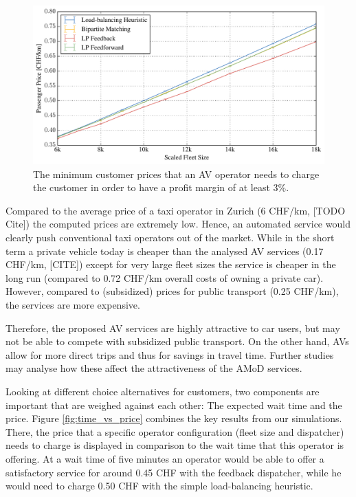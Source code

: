 \begin{figure}
\includegraphics[width=1.0\textwidth]{figures/01_passenger_price.pdf}
\caption{The minimum customer prices that an AV operator needs to charge the customer
in order to have a profit margin of at least 3\%.}
\label{fig:passenger_price}
\end{figure}

Compared to the average price of a taxi operator in Zurich (6 CHF/km, [TODO Cite])
the computed prices are extremely low. Hence, an automated service would clearly
push conventional taxi operators out of the market. While in the short term a
private vehicle today is cheaper than the analysed AV services (0.17 CHF/km, [CITE])
except for very large fleet sizes the service is cheaper in the long run (compared
to 0.72 CHF/km overall costs of owning a private car). However, compared to
(subsidized) prices for public transport (0.25 CHF/km), the services are more
expensive.

Therefore, the proposed AV services are highly attractive to car users, but may
not be able to compete with subsidized public transport. On the other hand, AVs
allow for more direct trips and thus for savings in travel time. Further studies
may analyse how these affect the attractiveness of the AMoD services.

Looking at different choice alternatives for customers, two components are important
that are weighed against each other: The expected wait time and the price. Figure
\ref{fig:time_vs_price} combines the key results from our simulations. There,
the price that a specific operator configuration (fleet size and dispatcher)
needs to charge is
displayed in comparison to the wait time that this operator is offering.
At a wait time of five minutes an operator would be able to offer a satisfactory service
for around 0.45 CHF with the feedback dispatcher, while he would need to charge
0.50 CHF with the simple load-balancing heuristic. 

